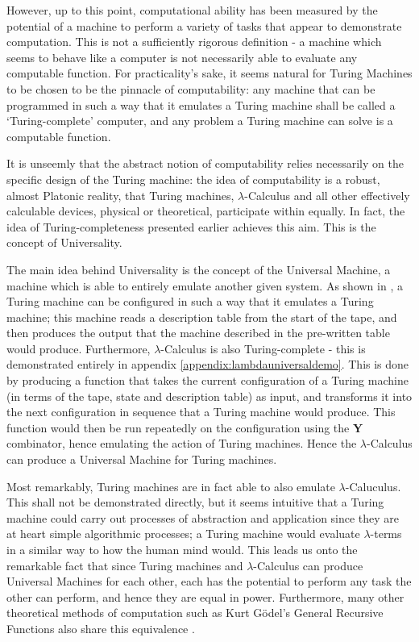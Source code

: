 \documentclass[Master.tex]{subfiles}
\begin{document}
However, up to this point, computational ability has been measured by the potential of a machine to perform a variety of tasks that appear to demonstrate computation. This is not a sufficiently rigorous definition - a machine which seems to behave like a computer is not necessarily able to evaluate any computable function. For practicality's sake, it seems natural for Turing Machines to be chosen to be the pinnacle of computability: any machine that can be programmed in such a way that it emulates a Turing machine shall be called a  `Turing-complete' computer, and any problem a Turing machine can solve is a computable function.

It is unseemly that the abstract notion of computability relies necessarily on the specific design of the Turing machine: the idea of computability is a robust, almost Platonic reality, that Turing machines, $\lambda$-Calculus and all other effectively calculable devices, physical or theoretical, participate within equally. In fact, the idea of Turing-completeness presented earlier achieves this aim. This is the concept of Universality.

The main idea behind Universality is the concept of the Universal Machine, a machine which is able to entirely emulate another given system. As shown in \cite{turing1936computablenumbers}, a Turing machine can be configured in such a way that it emulates a Turing machine; this machine reads a description table from the start of the tape, and then produces the output that the machine described in the pre-written table would produce. Furthermore, $\lambda$-Calculus is also Turing-complete - this is demonstrated entirely in appendix \ref{appendix:lambdauniversaldemo}. This is done by producing a function that takes the current configuration of a Turing machine (in terms of the tape, state and description table) as input, and transforms it into the next configuration in sequence that a Turing machine would produce. This function would then be run repeatedly on the configuration using the \textbf{Y} combinator, hence emulating the action of Turing machines. Hence the $\lambda$-Calculus can produce a Universal Machine for Turing machines.

Most remarkably, Turing machines are in fact able to also emulate $\lambda$-Caluculus. This shall not be demonstrated directly, but it seems intuitive that a Turing machine could carry out processes of abstraction and application since they are at heart simple algorithmic processes; a Turing machine would evaluate $\lambda$-terms in a similar way to how the human mind would. This leads us onto the remarkable fact that since Turing machines and $\lambda$-Calculus can produce Universal Machines for each other, each has the potential to perform any task the other can perform, and hence they are equal in power. Furthermore, many other theoretical methods of computation such as Kurt G\"odel's General Recursive Functions also share this equivalence \cite{copeland2002ctt}.
\end{document}
